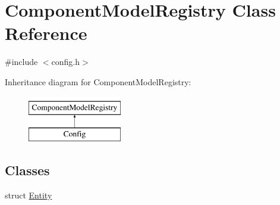 \hypertarget{class_component_model_registry}{\section{Component\+Model\+Registry Class Reference}
\label{class_component_model_registry}
}


{\ttfamily \#include $<$config.\+h$>$}

Inheritance diagram for Component\+Model\+Registry\+:\begin{figure}[H]
\begin{center}
\leavevmode
\includegraphics[height=2.000000cm]{class_component_model_registry}
\end{center}
\end{figure}
\subsection*{Classes}
\begin{DoxyCompactItemize}
\item 
struct \hyperlink{struct_component_model_registry_1_1_entity}{Entity}
\end{DoxyCompactItemize}

